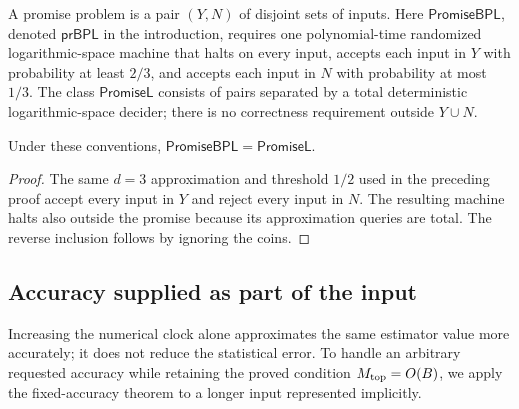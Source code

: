 A promise problem is a pair $(Y,N)$ of disjoint sets of inputs.
Here $\mathsf{PromiseBPL}$, denoted $\mathsf{prBPL}$ in the introduction,
requires one polynomial-time randomized
logarithmic-space machine that halts on every input, accepts each
input in $Y$ with probability at least $2/3$, and accepts each
input in $N$ with probability at most $1/3$.
The class $\mathsf{PromiseL}$ consists of pairs separated by a total
deterministic logarithmic-space decider; there is no correctness
requirement outside $Y\cup N$.

\begin{corollary}\label{cor:promise-bpl}
Under these conventions,
$\mathsf{PromiseBPL}=\mathsf{PromiseL}$.
\end{corollary}

\begin{proof}
The same $d=3$ approximation and threshold $1/2$ used in the preceding
proof accept every input in $Y$ and reject every input in $N$.
The resulting machine halts also outside the promise because its
approximation queries are total. The reverse inclusion follows by
ignoring the coins.
\end{proof}

\subsection{Accuracy supplied as part of the input}

Increasing the numerical clock alone approximates the same estimator
value more accurately; it does not reduce the statistical error.
To handle an arbitrary requested accuracy while retaining the proved
condition $M_{\rm top}=O(B)$, we apply the fixed-accuracy theorem
to a longer input represented implicitly.

